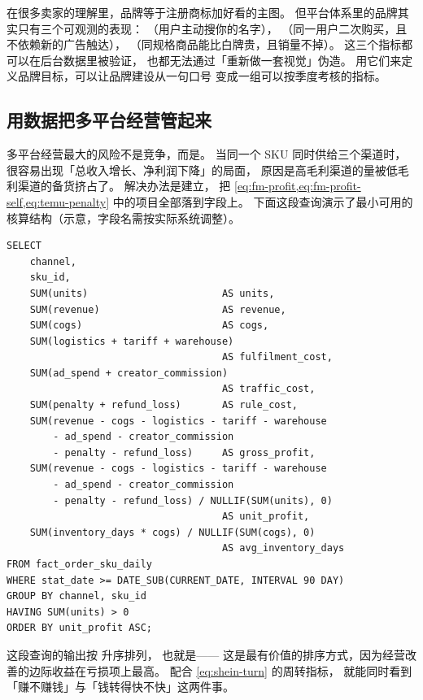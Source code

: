 \begin{insight}[「品牌」在平台体系里的现实定义]
在很多卖家的理解里，品牌等于注册商标加好看的主图。
但平台体系里的品牌其实只有三个可观测的表现：
（用户主动搜你的名字），
（同一用户二次购买，且不依赖新的广告触达），
（同规格商品能比白牌贵，且销量不掉）。
这三个指标都可以在后台数据里被验证，
也都无法通过「重新做一套视觉」伪造。
用它们来定义品牌目标，可以让品牌建设从一句口号
变成一组可以按季度考核的指标。
\end{insight}

\subsection{用数据把多平台经营管起来}

多平台经营最大的风险不是竞争，而是。
当同一个 SKU 同时供给三个渠道时，
很容易出现「总收入增长、净利润下降」的局面，
原因是高毛利渠道的量被低毛利渠道的备货挤占了。
解决办法是建立，
把 \cref{eq:fm-profit,eq:fm-profit-self,eq:temu-penalty} 中的项目全部落到字段上。
下面这段查询演示了最小可用的核算结构（示意，字段名需按实际系统调整）。

\begin{lstlisting}[style=growth, language=SQLx, caption={按渠道与 SKU 核算单件净利（示意）}]
SELECT
    channel,
    sku_id,
    SUM(units)                       AS units,
    SUM(revenue)                     AS revenue,
    SUM(cogs)                        AS cogs,
    SUM(logistics + tariff + warehouse)
                                     AS fulfilment_cost,
    SUM(ad_spend + creator_commission)
                                     AS traffic_cost,
    SUM(penalty + refund_loss)       AS rule_cost,
    SUM(revenue - cogs - logistics - tariff - warehouse
        - ad_spend - creator_commission
        - penalty - refund_loss)     AS gross_profit,
    SUM(revenue - cogs - logistics - tariff - warehouse
        - ad_spend - creator_commission
        - penalty - refund_loss) / NULLIF(SUM(units), 0)
                                     AS unit_profit,
    SUM(inventory_days * cogs) / NULLIF(SUM(cogs), 0)
                                     AS avg_inventory_days
FROM fact_order_sku_daily
WHERE stat_date >= DATE_SUB(CURRENT_DATE, INTERVAL 90 DAY)
GROUP BY channel, sku_id
HAVING SUM(units) > 0
ORDER BY unit_profit ASC;
\end{lstlisting}

这段查询的输出按  升序排列，
也就是——
这是最有价值的排序方式，因为经营改善的边际收益在亏损项上最高。
配合 \cref{eq:shein-turn} 的周转指标，
就能同时看到「赚不赚钱」与「钱转得快不快」这两件事。


